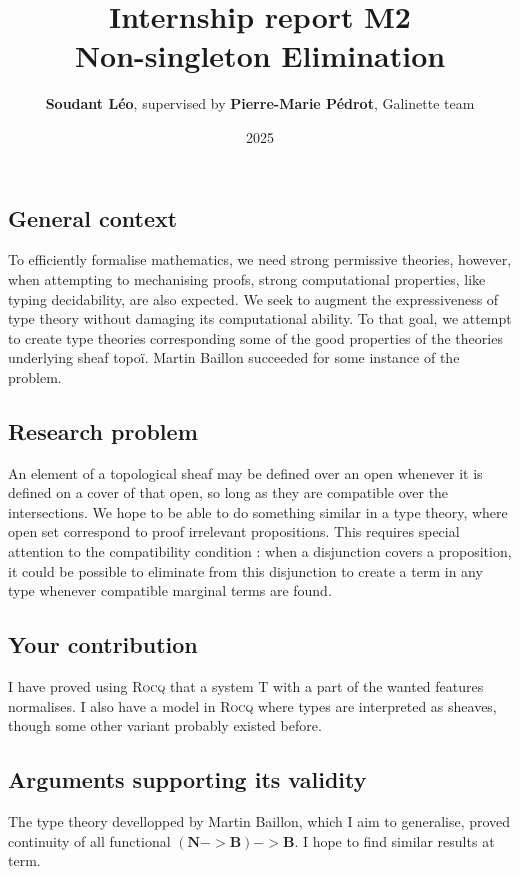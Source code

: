 \documentclass[11pt]{article}
\title{Internship report M2\\  Non-singleton Elimination\\}
\author{\textbf{Soudant L\'eo}, supervised by \textbf{Pierre-Marie P\'edrot}, Galinette team}
\date{2025}
\newcommand{\0}{\mathbf{0}}
\newcommand{\1}{\mathbf{1}}
\newcommand{\nat}{\mathbf{N}}
\newcommand{\bool}{\mathbf{B}}
\begin{document}
\begin{titlepage}
    
\maketitle

\end{titlepage}


\subsection*{General context}
To efficiently formalise mathematics, we need strong permissive theories, however, when attempting to mechanising proofs, strong computational properties, like typing decidability, are also expected.
We seek to augment the expressiveness of type theory without damaging its computational ability.
To that goal, we attempt to create type theories corresponding some of the good properties of the theories underlying sheaf topoï. Martin Baillon succeeded for some instance of the problem.
\subsection*{Research problem}
An element of a topological sheaf may be defined over an open whenever it is defined on a cover of that open, so long as they are compatible over the intersections.
We hope to be able to do something similar in a type theory, where open set correspond to proof irrelevant propositions.
This requires special attention to the compatibility condition : when a disjunction covers a proposition, it could be possible to eliminate from this disjunction to create a term in any type whenever compatible marginal terms are found.
\subsection*{Your contribution}
I have proved using \textsc{Rocq} that a system T with a part of the wanted features normalises. I also have a model in \textsc{Rocq} where types are interpreted as sheaves, though some other variant probably existed before.
\subsection*{Arguments supporting its validity}
The type theory devellopped by Martin Baillon, which I aim to generalise, proved continuity of all functional $(\nat -> \bool) -> \bool$. I hope to find similar results at term.
\end{document}

